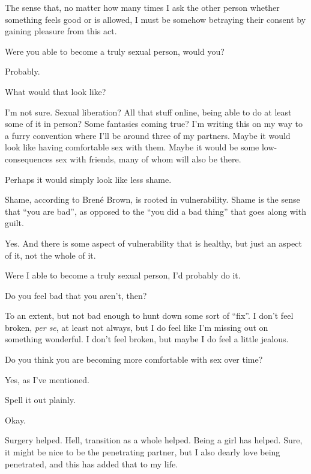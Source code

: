 \begin{leftcolumn}
The sense that, no matter how many times I ask the other person whether something feels good or is allowed, I must be somehow betraying their consent by gaining pleasure from this act.
\newpage

\begin{ally}
Were you able to become a truly sexual person, would you?
\end{ally}
Probably.

\begin{ally}
What would that look like?
\end{ally}
I'm not sure. Sexual liberation? All that stuff online, being able to do at least some of it in person? Some fantasies coming true? I'm writing this on my way to a furry convention where I'll be around three of my partners. Maybe it would look like having comfortable sex with them. Maybe it would be some low-consequences sex with friends, many of whom will also be there.

Perhaps it would simply look like less shame.

\begin{ally}
Shame, according to Brené Brown, is rooted in vulnerability. Shame is the sense that ``you are bad'', as opposed to the ``you did a bad thing'' that goes along with guilt.
\end{ally}
Yes. And there is some aspect of vulnerability that is healthy, but just an aspect of it, not the whole of it.

Were I able to become a truly sexual person, I'd probably do it.

\begin{ally}
Do you feel bad that you aren't, then?
\end{ally}
To an extent, but not bad enough to hunt down some sort of ``fix''. I don't feel broken, \emph{per se}, at least not always, but I do feel like I'm missing out on something wonderful. I don't feel broken, but maybe I do feel a little jealous.
\newpage

\begin{ally}
Do you think you are becoming more comfortable with sex over time?
\end{ally}
Yes, as I've mentioned.

\begin{ally}
Spell it out plainly.
\end{ally}
Okay.

Surgery helped. Hell, transition as a whole helped. Being a girl has helped. Sure, it might be nice to be the penetrating partner, but I also dearly love being penetrated, and this has added that to my life.


\end{leftcolumn}
